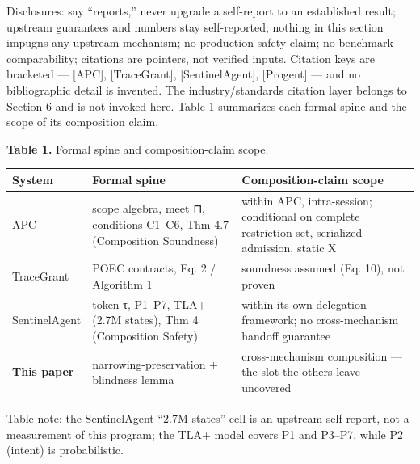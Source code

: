\documentclass[
  10pt,
]{article}
\newcounter{none} %
\renewcommand{\_}{\origunderscore\allowbreak}
\begin{document}
Disclosures: say ``reports,'' never upgrade a self-report to an
established result; upstream guarantees and numbers stay self-reported;
nothing in this section impugns any upstream mechanism; no
production-safety claim; no benchmark comparability; citations are
pointers, not verified inputs. Citation keys are bracketed ---
{[}APC{]}, {[}TraceGrant{]}, {[}SentinelAgent{]}, {[}Progent{]} --- and
no bibliographic detail is invented. The industry/standards citation
layer belongs to Section 6 and is not invoked here. Table 1 summarizes
each formal spine and the scope of its composition claim.

\textbf{Table 1.} Formal spine and composition-claim scope.

{\def\LTcaptype{none} %
\begin{longtable}[]{@{}
  >{\raggedright\arraybackslash}p{}
  >{\raggedright\arraybackslash}p{}
  >{\raggedright\arraybackslash}p{}@{}}
\toprule\noalign{}
\begin{minipage}[b]{\linewidth}\raggedright
System
\end{minipage} & \begin{minipage}[b]{\linewidth}\raggedright
Formal spine
\end{minipage} & \begin{minipage}[b]{\linewidth}\raggedright
Composition-claim scope
\end{minipage} \\
\midrule\noalign{}
\endhead
\bottomrule\noalign{}
\endlastfoot
APC & scope algebra, meet ⊓, conditions C1--C6, Thm 4.7 (Composition
Soundness) & within APC, intra-session; conditional on complete
restriction set, serialized admission, static X \\
TraceGrant & POEC contracts, Eq. 2 / Algorithm 1 & soundness assumed
(Eq. 10), not proven \\
SentinelAgent & token τ, P1--P7, TLA+ (2.7M states), Thm 4 (Composition
Safety) & within its own delegation framework; no cross-mechanism
handoff guarantee \\
\textbf{This paper} & narrowing-preservation + blindness lemma &
cross-mechanism composition --- the slot the others leave uncovered \\
\end{longtable}
}

Table note: the SentinelAgent ``2.7M states'' cell is an upstream
self-report, not a measurement of this program; the TLA+ model covers P1
and P3--P7, while P2 (intent) is probabilistic.
\end{document}
